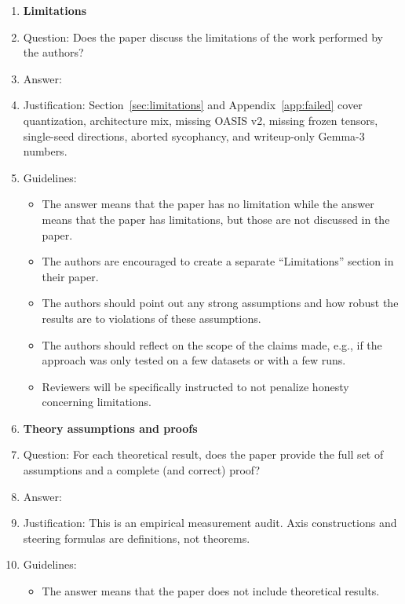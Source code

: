 \begin{enumerate}
\item {\bf Limitations}
\item[] Question: Does the paper discuss the limitations of the work performed by the authors?
\item[] Answer: \answerYes{}
\item[] Justification: Section~\ref{sec:limitations} and Appendix~\ref{app:failed} cover quantization, architecture mix, missing OASIS v2, missing frozen tensors, single-seed directions, aborted sycophancy, and writeup-only Gemma-3 numbers.
\item[] Guidelines:
\begin{itemize}
\item The answer \answerNA{} means that the paper has no limitation while the answer \answerNo{} means that the paper has limitations, but those are not discussed in the paper.
\item The authors are encouraged to create a separate ``Limitations'' section in their paper.
\item The authors should point out any strong assumptions and how robust the results are to violations of these assumptions.
\item The authors should reflect on the scope of the claims made, e.g., if the approach was only tested on a few datasets or with a few runs.
\item Reviewers will be specifically instructed to not penalize honesty concerning limitations.
\end{itemize}

\item {\bf Theory assumptions and proofs}
\item[] Question: For each theoretical result, does the paper provide the full set of assumptions and a complete (and correct) proof?
\item[] Answer: \answerNA{}
\item[] Justification: This is an empirical measurement audit. Axis constructions and steering formulas are definitions, not theorems.
\item[] Guidelines:
\begin{itemize}
\item The answer \answerNA{} means that the paper does not include theoretical results.
\end{itemize}


\end{enumerate}
